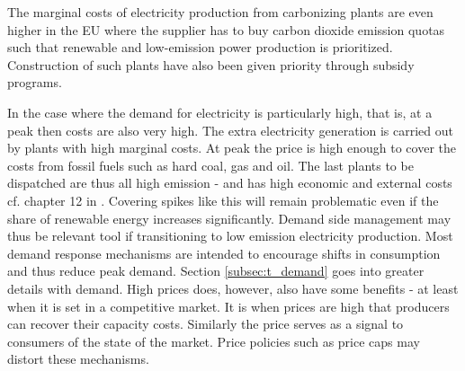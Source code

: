 \noindent The marginal costs of electricity production from carbonizing plants are even higher in the EU where the supplier has to buy carbon dioxide emission quotas such that renewable and low-emission power production is prioritized. Construction of such plants have also been given priority through subsidy programs.  \bigskip \par
In the case where the demand for electricity is particularly high, that is, at a peak then costs are also very high. The extra electricity generation is carried out by plants with high marginal costs. At peak the price is high enough to cover the costs from fossil fuels such as hard coal, gas and oil. The last plants to be dispatched are thus all high emission - and has high economic and external costs cf. chapter 12 in \citet{zweifel2017energy}. Covering spikes like this will remain problematic even if the share of renewable energy increases significantly. Demand side management may thus be relevant tool if transitioning to low emission electricity production. Most demand response mechanisms are intended to encourage shifts in consumption and thus reduce peak demand. Section \ref{subsec:t_demand} goes into greater details with demand. High prices does, however, also have some benefits - at least when it is set in a competitive market. It is when prices are high that producers can recover their capacity costs. Similarly the price serves as a signal to consumers of the state of the market. Price policies such as price caps may distort these mechanisms. 



